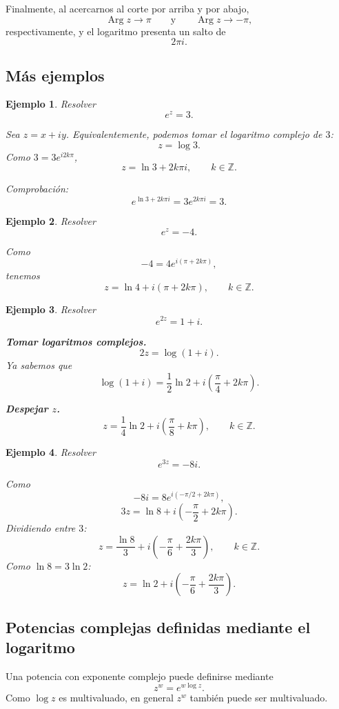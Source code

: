 \documentclass[12pt]{article}
\newtheorem{Ejem}{Ejemplo}
\DeclareMathOperator{\Arg}{Arg}
\begin{document}
Finalmente, al acercarnos al corte por arriba y por abajo,
\[
\Arg z\to\pi
\qquad\text{y}\qquad
\Arg z\to-\pi,
\]
respectivamente, y el logaritmo presenta un salto de
\[
\boxed{2\pi i.}
\]

\subsection*{M\'as ejemplos}
\begin{Ejem}
Resolver
\[
e^z=3.
\]

Sea $z=x+iy$. Equivalentemente, podemos tomar el logaritmo complejo de $3$:
\[
z=\log3.
\]
Como $3=3e^{i2k\pi}$,
\[
\boxed{
z=\ln3+2k\pi i,\qquad k\in\mathbb Z.
}
\]

Comprobación:
\[
e^{\ln3+2k\pi i}
=3e^{2k\pi i}=3.
\]
\end{Ejem}

\begin{Ejem}
Resolver
\[
e^z=-4.
\]

Como
\[
-4=4e^{i(\pi+2k\pi)},
\]
tenemos
\[
\boxed{
z=\ln4+i(\pi+2k\pi),\qquad k\in\mathbb Z.
}
\]
\end{Ejem}

\begin{Ejem}
Resolver
\[
e^{2z}=1+i.
\]

\textbf{Tomar logaritmos complejos.}
\[
2z=\log(1+i).
\]
Ya sabemos que
\[
\log(1+i)
=
\frac12\ln2
+i\left(\frac{\pi}{4}+2k\pi\right).
\]

\textbf{Despejar $z$.}
\[
\boxed{
z=
\frac14\ln2
+i\left(\frac{\pi}{8}+k\pi\right),
\qquad k\in\mathbb Z.
}
\]
\end{Ejem}

\begin{Ejem}
Resolver
\[
e^{3z}=-8i.
\]

Como
\[
-8i=8e^{i(-\pi/2+2k\pi)},
\]
\[
3z=\ln8+i\left(-\frac{\pi}{2}+2k\pi\right).
\]
Dividiendo entre $3$:
\[
\boxed{
z=\frac{\ln8}{3}
+i\left(-\frac{\pi}{6}+\frac{2k\pi}{3}\right),
\qquad k\in\mathbb Z.
}
\]
Como $\ln8=3\ln2$:
\[
\boxed{
z=\ln2+i\left(-\frac{\pi}{6}+\frac{2k\pi}{3}\right).
}
\]
\end{Ejem}
\subsection*{Potencias complejas definidas mediante el logaritmo}
Una potencia con exponente complejo puede definirse mediante
\[
\boxed{
z^w=e^{w\log z}.
}
\]
Como $\log z$ es multivaluado, en general $z^w$ también puede ser
multivaluado.
\end{document}
